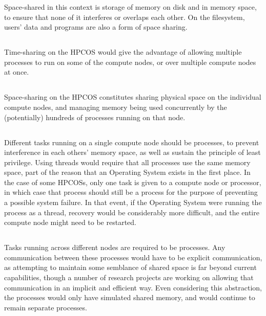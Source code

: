 \documentclass{article}
\begin{document}
Space-shared in this context is storage of memory on disk and in memory space, to ensure that none of it interferes or overlaps each other. On the filesystem, users' data and programs are also a form of space sharing.

\subsection{}
Time-sharing on the HPCOS would give the advantage of allowing multiple processes to run on some of the compute nodes, or over multiple compute nodes at once.

\subsection{}
Space-sharing on the HPCOS constitutes sharing physical space on the individual compute nodes, and managing memory being used concurrently by the (potentially) hundreds of processes running on that node.

\subsection{}
Different tasks running on a single compute node should be processes, to prevent interference in each others' memory space, as well as sustain the principle of least privilege. Using threads would require that all processes use the same memory space, part of the reason that an Operating System exists in the first place.
In the case of some HPCOSs, only one task is given to a compute node or processor, in which case that process should still be a process for the purpose of preventing a possible system failure. In that event, if the Operating System were running the process as a thread, recovery would be considerably more difficult, and the entire compute node might need to be restarted.

\subsection{}
Tasks running across different nodes are required to be processes. Any communication between these processes would have to be explicit communication, as attempting to maintain some semblance of shared space is far beyond current capabilities, though a number of research projects are working on allowing that communication in an implicit and efficient way. Even considering this abstraction, the processes would only have simulated shared memory, and would continue to remain separate processes.
\end{document}
